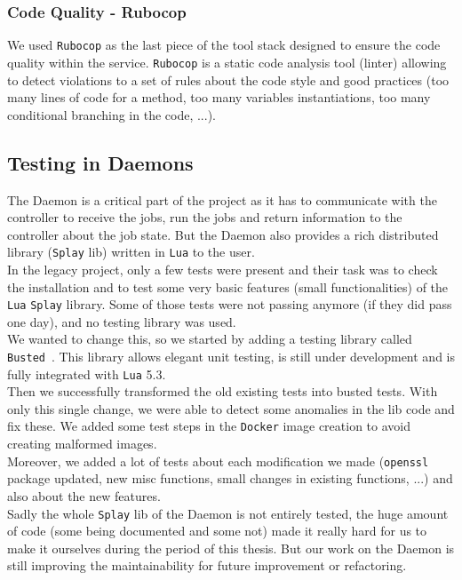 \documentclass{eplmastersthesis}
\begin{document}
        \subsubsection{Code Quality - Rubocop}

          We used \texttt{Rubocop} as the last piece of the tool stack designed to ensure
          the code quality within the service. \texttt{Rubocop} is a static code analysis
          tool (linter) allowing to detect violations to a set of rules about
          the code style and good practices (too many lines of code for a method,
          too many variables instantiations, too many conditional branching
          in the code, ...).

      \subsection{Testing in Daemons}

        The Daemon is a critical part of the project as it has to communicate
        with the controller to receive the jobs, run the jobs and return
        information to the controller about the job state. But the Daemon also
        provides a rich distributed library (\texttt{Splay} lib) written in \texttt{Lua} to the user.\\
        In the legacy project, only a few tests were present and their
        task was to check the installation and to test some very basic features
        (small functionalities) of the \texttt{Lua} \texttt{Splay} library. Some of those tests
        were not passing anymore (if they did pass one day), and no testing
        library was used.\\

        We wanted to change this, so we started by adding a testing library
        called \texttt{Busted}~\cite{busted}. This library allows elegant unit testing,
        is still under development and is fully integrated with \texttt{Lua} 5.3.\\
        Then we successfully transformed the old existing tests into busted
        tests. With only this single change, we were able to detect some
        anomalies in the lib code and fix these. We added some test steps
        in the \texttt{Docker} image creation to avoid creating malformed images.\\

        Moreover, we added a lot of tests about each modification we made
        (\texttt{openssl} package updated, new misc functions, small changes in existing
        functions, ...) and also about the new features.\\
        Sadly the whole \texttt{Splay} lib of the Daemon is not entirely tested,
        the huge amount of code (some being documented and some not) made it
        really hard for us to make it ourselves during the period of this
        thesis. But our work on the Daemon is still improving the maintainability
        for future improvement or refactoring.
\end{document}
